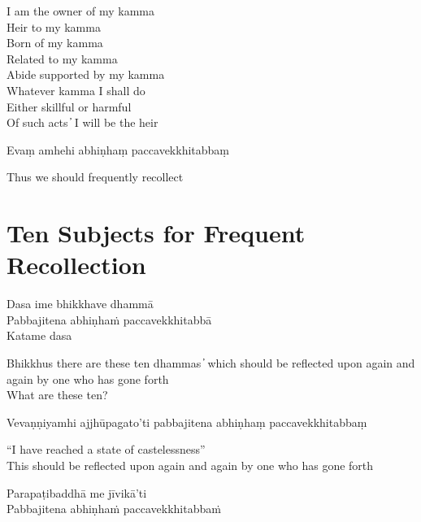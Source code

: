\begin{english}
I am the owner of my kamma\\
Heir to my kamma\\
Born of my kamma\\
Related to my kamma\\
Abide supported by my kamma\\
Whatever kamma I shall do\\
Either skillful or harmful\\
Of such acts  ̓  I will be the heir
\end{english}

Evaṃ amhehi abhiṇhaṃ paccavekkhitabbaṃ

\begin{english}
  Thus we should frequently recollect
\end{english}


\clearpage

\section{Ten Subjects for Frequent Recollection}

\begin{leader}
\end{leader}

Dasa ime bhikkhave dhammā\\
Pabbajitena abhiṇhaṁ paccavekkhitabbā\\
Katame dasa

\begin{english}
Bhikkhus there are these ten dhammas  ̓  which should be reflected upon again and again by one who has gone forth\\
What are these ten?
\end{english}

Vevaṇṇiyamhi ajjhūpagato'ti pabbajitena abhiṇhaṃ paccavekkhitabbaṃ

\begin{english}
“I have reached a state of castelessness”\\
This should be reflected upon again and again by one who has gone forth
\end{english}

Parapaṭibaddhā me jīvikā’ti\\
Pabbajitena abhiṇhaṁ paccavekkhitabbaṁ

